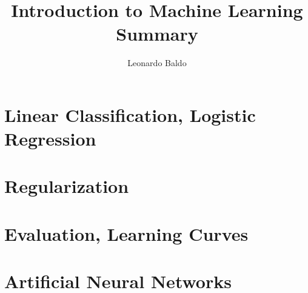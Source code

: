 \documentclass{article}
\title{Introduction to Machine Learning Summary}
\author{Leonardo Baldo}
\date{}
\begin{document}
\maketitle
\newpage

\tableofcontents
\newpage




\section{Linear Classification, Logistic Regression}
\newpage

\section{Regularization}
\newpage

\section{Evaluation, Learning Curves}
\newpage

\section{Artificial Neural Networks}
\newpage
\end{document}
